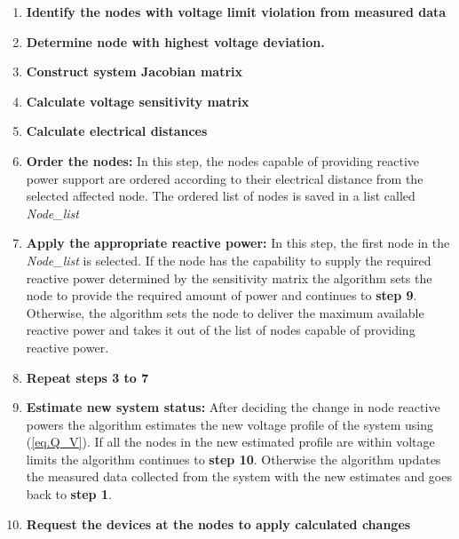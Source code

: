 \begin{enumerate}
\item \textbf{Identify the nodes with voltage limit violation from measured data}
\item \textbf{Determine node with highest voltage deviation.}
\item \textbf{Construct system Jacobian matrix}
\item \textbf{Calculate voltage sensitivity matrix}
\item \textbf{Calculate electrical distances}
\item \textbf{Order the nodes:} In this step, the nodes capable of providing reactive power support are ordered according to their electrical distance from the selected affected node. The ordered list of nodes is saved in a list called \textit{Node\_list}
\item \textbf{Apply the appropriate reactive power:} In this step, the first node in the \textit{Node\_list} is selected. If the node has the capability to supply the required reactive power determined by the sensitivity matrix the algorithm sets the node to provide the required amount of power and continues to \textbf{step 9}. Otherwise, the algorithm sets the node to deliver the maximum available reactive power and takes it out of the list of nodes capable of providing reactive power.
\item \textbf{Repeat steps 3 to 7}
\item \textbf{Estimate new system status:} After deciding the change in node reactive powers the algorithm estimates the new voltage profile of the system using (\ref{eq.Q_V}). If all the nodes in the new estimated profile are within voltage limits the algorithm continues to \textbf{step 10}. Otherwise the algorithm updates the measured data collected from the system with the new estimates and goes back to  \textbf{step 1}.

\item \textbf{Request the devices at the nodes to apply calculated changes}
\end{enumerate}



